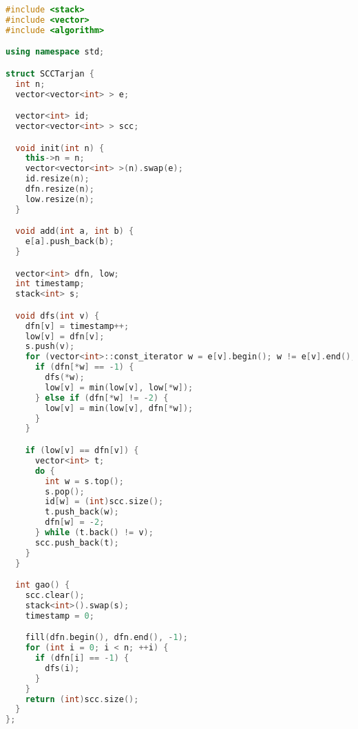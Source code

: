\begin{lstlisting}[language=C++]
#include <stack>
#include <vector>
#include <algorithm>

using namespace std;

struct SCCTarjan {
  int n;
  vector<vector<int> > e;

  vector<int> id;
  vector<vector<int> > scc;

  void init(int n) {
    this->n = n;
    vector<vector<int> >(n).swap(e);
    id.resize(n);
    dfn.resize(n);
    low.resize(n);
  }

  void add(int a, int b) {
    e[a].push_back(b);
  }

  vector<int> dfn, low;
  int timestamp;
  stack<int> s;

  void dfs(int v) {
    dfn[v] = timestamp++;
    low[v] = dfn[v];
    s.push(v);
    for (vector<int>::const_iterator w = e[v].begin(); w != e[v].end(); ++w) {
      if (dfn[*w] == -1) {
        dfs(*w);
        low[v] = min(low[v], low[*w]);
      } else if (dfn[*w] != -2) {
        low[v] = min(low[v], dfn[*w]);
      }
    }

    if (low[v] == dfn[v]) {
      vector<int> t;
      do {
        int w = s.top();
        s.pop();
        id[w] = (int)scc.size();
        t.push_back(w);
        dfn[w] = -2;
      } while (t.back() != v);
      scc.push_back(t);
    }
  }

  int gao() {
    scc.clear();
    stack<int>().swap(s);
    timestamp = 0;

    fill(dfn.begin(), dfn.end(), -1);
    for (int i = 0; i < n; ++i) {
      if (dfn[i] == -1) {
        dfs(i);
      }
    }
    return (int)scc.size();
  }
};


\end{lstlisting}
